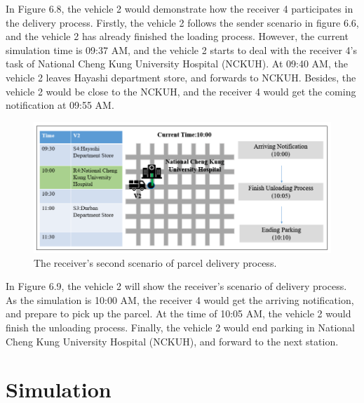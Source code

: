 \documentclass[12pt]{ksthesis}
\begin{document}
\begin{thesis}
{In Figure 6.8, the vehicle 2 would demonstrate how the receiver 4 participates in the delivery process. Firstly, the vehicle 2 follows the sender scenario in figure 6.6, and the vehicle 2 has already finished the loading process.
However, the current simulation time is 09:37 AM, and the vehicle 2 starts to deal with the receiver 4’s task of National Cheng Kung University Hospital (NCKUH). At 09:40 AM, the vehicle 2 leaves Hayashi department store, and forwards to NCKUH. Besides, the vehicle 2 would be close to the NCKUH, and the receiver 4 would get the coming notification at 09:55 AM.


\begin{figure}[H]
\centering
\includegraphics[scale=0.65]{./Thesis_figures/F6-9_receiverScenario2.PNG}
\caption{\large The receiver's second scenario of parcel delivery process.}
\vspace{0.5cm}
\label{Fig:Second_ReceiverScenario_DeliveryProcess}
\end{figure}

In Figure 6.9, the vehicle 2 will show the receiver’s scenario of delivery process. As the simulation is 10:00 AM, the receiver 4 would get the arriving notification, and prepare to pick up the parcel. At the time of 10:05 AM, the vehicle 2 would finish the unloading process. Finally, the vehicle 2 would end parking in National Cheng Kung University Hospital (NCKUH), and forward to the next station.








\chapter{Simulation}\label{Chap:Simulation}

}
\end{thesis}
\end{document}
